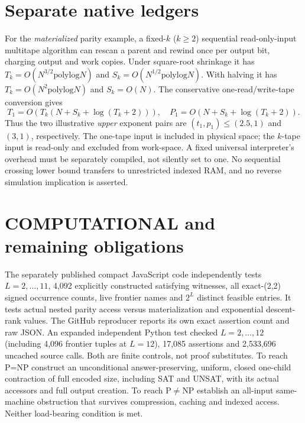 \documentclass[11pt]{article}
\begin{document}
\section{Separate native ledgers}
For the \emph{materialized} parity example, a fixed-$k$ ($k\ge2$) sequential read-only-input multitape algorithm can rescan a parent and rewind once per output bit, charging output and work copies. Under square-root shrinkage it has $T_k=O(N^{3/2}\mathrm{polylog}N)$ and $S_k=O(N^{1/2}\mathrm{polylog}N)$. With halving it has $T_k=O(N^2\mathrm{polylog}N)$ and $S_k=O(N)$. The conservative one-read/write-tape conversion gives
\[
T_1=O(T_k(N+S_k+\log(T_k+2))),\quad
P_1=O(N+S_k+\log(T_k+2)).
\]
Thus the two illustrative \emph{upper} exponent pairs are $(t_1,p_1)\le(2.5,1)$ and $(3,1)$, respectively. The one-tape input is included in physical space; the $k$-tape input is read-only and excluded from work-space. A fixed universal interpreter's overhead must be separately compiled, not silently set to one. No sequential crossing lower bound transfers to unrestricted indexed RAM, and no reverse simulation implication is asserted.
\section{COMPUTATIONAL and remaining obligations}
The separately published compact JavaScript code independently tests $L=2,\ldots,11$, 4,092 explicitly constructed satisfying witnesses, all exact-(2,2) signed occurrence counts, live frontier names and $2^L$ distinct feasible entries. It tests actual nested parity access versus materialization and exponential descent-rank values. The GitHub reproducer reports its own exact assertion count and raw JSON. An expanded independent Python test checked $L=2,\ldots,12$ (including 4,096 frontier tuples at $L=12$), 17,085 assertions and 2,533,696 uncached source calls. Both are finite controls, not proof substitutes.
To reach P=NP construct an unconditional answer-preserving, uniform, closed one-child contraction of full encoded size, including SAT and UNSAT, with its actual accessors and full output creation. To reach P$\ne$NP establish an all-input same-machine obstruction that survives compression, caching and indexed access. Neither load-bearing condition is met.
\end{document}
